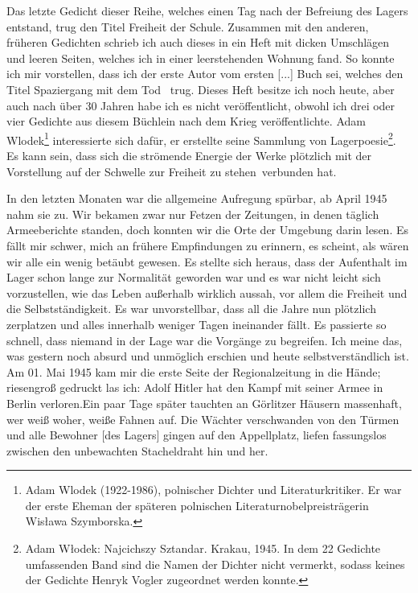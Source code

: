 \documentclass[a4paper,12pt,ngerman,
]{nisebook}
\begin{document}
Das letzte Gedicht dieser Reihe, welches einen Tag nach der Befreiung des Lagers entstand, trug den Titel \glqq Freiheit der Schule\grqq. Zusammen mit den anderen, früheren Gedichten schrieb ich auch dieses in ein Heft mit dicken Umschlägen und leeren Seiten, welches ich in einer leerstehenden Wohnung fand. So konnte ich mir vorstellen, dass ich der erste Autor vom ersten [...] Buch sei, welches den Titel \glqq Spaziergang mit dem Tod\grqq~ trug. Dieses Heft besitze ich noch heute, aber auch nach über 30 Jahren habe ich es nicht veröffentlicht, obwohl ich drei oder vier Gedichte aus diesem Büchlein nach dem Krieg veröffentlichte. Adam Wlodek\footnote{Adam Wlodek (1922-1986), polnischer Dichter und Literaturkritiker. Er war der erste Eheman der späteren polnischen Literaturnobelpreisträgerin Wis\l awa Szymborska.} interessierte sich dafür, er erstellte seine Sammlung von Lagerpoesie\footnote{Adam W\l odek: Najcichszy Sztandar. Krakau, 1945. In dem 22 Gedichte umfassenden Band sind die Namen der Dichter nicht vermerkt, sodass keines der Gedichte Henryk Vogler zugeordnet werden konnte.}.
Es kann sein, dass sich die strömende Energie der Werke plötzlich mit der Vorstellung \glqq auf der Schwelle zur Freiheit zu stehen\grqq~verbunden hat. 

In den letzten Monaten war die allgemeine Aufregung spürbar, ab April 1945 nahm sie zu. Wir bekamen zwar nur Fetzen der Zeitungen, in denen täglich Armeeberichte standen, doch konnten wir die Orte der Umgebung darin lesen. Es fällt mir schwer, mich an frühere Empfindungen zu erinnern, es scheint, als wären wir alle ein wenig betäubt gewesen. Es stellte sich heraus, dass der Aufenthalt im Lager schon lange zur Normalität geworden war und es war nicht leicht sich vorzustellen, wie das Leben außerhalb wirklich aussah, vor allem die Freiheit und die Selbstständigkeit. Es  war unvorstellbar, dass all die Jahre nun plötzlich zerplatzen und alles  innerhalb weniger Tagen ineinander fällt. Es passierte so schnell, dass niemand in der Lage war die Vorgänge zu begreifen. Ich meine das, was gestern noch absurd und unmöglich erschien und heute selbstverständlich ist. Am 01. Mai 1945 kam mir die erste Seite der Regionalzeitung in die Hände; riesengroß gedruckt las ich: \glqq Adolf Hitler hat den Kampf mit seiner Armee in Berlin verloren.\grqq Ein paar Tage später tauchten an Görlitzer Häusern massenhaft, wer weiß woher, weiße Fahnen auf. Die Wächter verschwanden von den Türmen und alle Bewohner [des Lagers] gingen auf den Appellplatz, liefen fassungslos zwischen den unbewachten Stacheldraht hin und her. 
\end{document}
